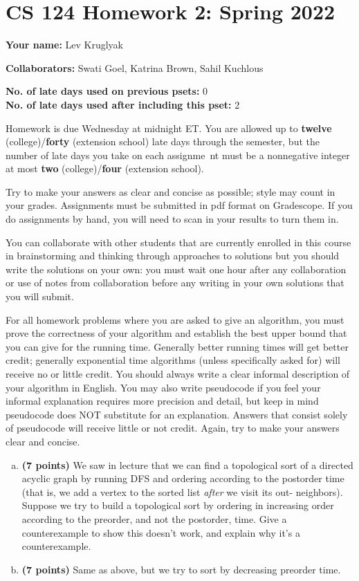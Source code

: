 \documentclass[11pt,letterpaper]{article}
\begin{document}
\section*{CS 124 Homework 2: Spring 2022}
\textbf{Your name:} Lev Kruglyak 

\textbf{Collaborators:} Swati Goel, Katrina Brown, Sahil Kuchlous

\textbf{No. of late days used on previous psets: } 0\\
\textbf{No. of late days used after including this pset: } 2

Homework is due Wednesday at midnight ET. You are allowed up to {\bf twelve} 
(college)/{\bf forty} (extension school) late days through the semester, but the number of late days you take on each assignme\ nt must be a nonnegative integer at most {\bf two} (college)/{\bf four} (extension school).

Try to make your answers as clear and concise as possible; style may count in your grades. Assignments must be submitted in pdf format on Gradescope. If you do assignments by hand, you will need to scan in your results to
turn them in.

You can collaborate with other students that are currently enrolled in this course in brainstorming and thinking through approaches to solutions but you should write the solutions on your own: you must wait one hour after any collaboration or use of notes from collaboration before any writing in your own solutions that you will submit.

For all homework problems where you are asked to give an algorithm, you must prove the correctness of your algorithm and establish the best upper bound that you can give for the running time. Generally better running times will get better credit; generally exponential time algorithms (unless specifically asked for) will receive no or little credit. You should always write a clear informal description of your algorithm in English. You may also write pseudocode if you feel your informal explanation requires more precision and detail, but keep in mind pseudocode does NOT substitute for an explanation. Answers that consist
solely of pseudocode will receive little or not credit. Again, try to make your 
answers clear and concise.

\pagebreak
\begin{problem}\noindent
    \begin{enumerate}[(a)]
        \item {\bf (7 points)} We saw in lecture that we can find a topological sort of a directed acyclic graph by running DFS and ordering according to the postorder time (that is, we add a vertex to the sorted list \emph{after} we visit its out- neighbors).  Suppose we try to build a topological sort by ordering in increasing order according to the preorder, and not the postorder, time.  Give a counterexample to show this doesn't work, and explain why it's a counterexample.  
        \item {\bf (7 points)} Same as above, but we try to sort by decreasing preorder time.
        \end{enumerate}
\end{problem}
\end{document}
